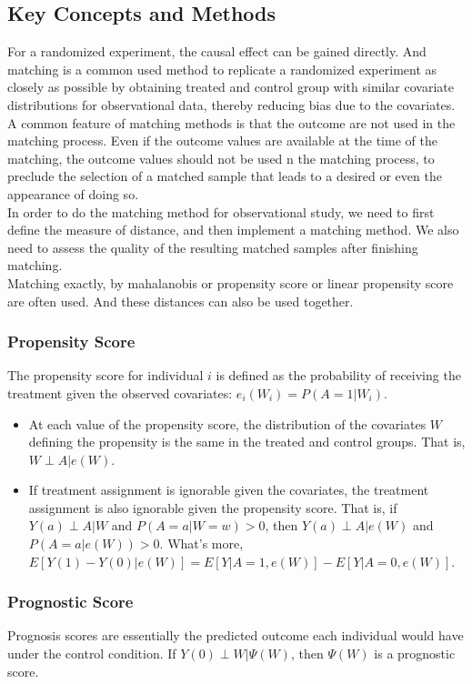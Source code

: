 \documentclass{article}
\begin{document}
\subsection{Key Concepts and Methods}
For a randomized experiment, the causal effect can be gained directly. And matching is a common used method to \textsf{replicate a randomized experiment} as closely as possible by obtaining treated and control group with similar covariate distributions for observational data, thereby reducing bias due to the covariates. \\
A common feature of matching methods is that the outcome are not used in the matching process. Even if the outcome values are available at the time of the matching, the outcome values should not be used n the matching process, to preclude the selection of a matched sample that leads to a desired or even the appearance of doing so.\\
In order to do the matching method for observational study, we need to first define the measure of distance, and then implement a matching method. We also need to assess the quality of the resulting matched samples after finishing matching.\\
Matching exactly, by mahalanobis or propensity score or linear propensity score are often used. And these distances can also be used together.\\
\subsubsection{Propensity Score}
The propensity score for individual $i$ is defined as the probability of receiving the treatment given the observed covariates: $e_{i}(W_{i})=P(A=1|W_{i})$.
\begin{itemize}
\item At each value of the propensity score, the distribution of the covariates $W$ defining the propensity is the same in the treated and control groups. That is, $W\perp A|e(W)$.
\item If treatment assignment is ignorable given the covariates, the treatment assignment is also ignorable given the propensity score. That is, if $Y(a)\perp A|W$ and $P(A=a|W=w)>0$, then $Y(a)\perp A|e(W)$ and $P(A=a|e(W))>0$. What's more, $E[Y(1)-Y(0)|e(W)]=E[Y|A=1, e(W)]-E[Y|A=0, e(W)]$.
\end{itemize}
\subsubsection{Prognostic Score}
Prognosis scores are essentially the predicted outcome each individual would have under the control condition. If $Y(0)\perp W|\Psi(W)$, then $\Psi(W)$ is a prognostic score.
\end{document}
